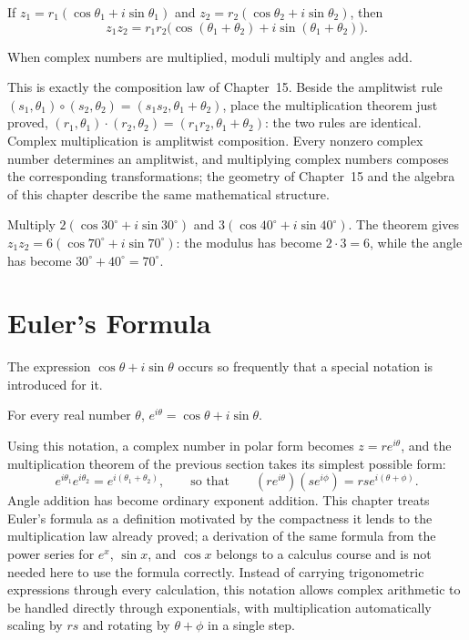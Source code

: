 \begin{theorem}
If $z_1 = r_1(\cos\theta_1+i\sin\theta_1)$ and $z_2 =
r_2(\cos\theta_2+i\sin\theta_2)$, then
\[
z_1z_2 = r_1r_2\Big(\cos(\theta_1+\theta_2) + i\sin(\theta_1+\theta_2)\Big).
\]
\end{theorem}

\begin{corollary}
When complex numbers are multiplied, moduli multiply and angles add.
\end{corollary}

This is exactly the composition law of Chapter~15. Beside the amplitwist
rule $(s_1,\theta_1)\circ(s_2,\theta_2) = (s_1s_2,\theta_1+\theta_2)$,
place the multiplication theorem just proved, $(r_1,\theta_1)\cdot(r_2,
\theta_2) = (r_1r_2,\theta_1+\theta_2)$: the two rules are identical.
Complex multiplication is amplitwist composition. Every nonzero complex
number determines an amplitwist, and multiplying complex numbers
composes the corresponding transformations; the geometry of Chapter~15
and the algebra of this chapter describe the same mathematical structure.

\begin{example}
Multiply $2(\cos30^\circ+i\sin30^\circ)$ and
$3(\cos40^\circ+i\sin40^\circ)$. The theorem gives $z_1z_2 =
6(\cos70^\circ+i\sin70^\circ)$: the modulus has become $2\cdot3=6$, while
the angle has become $30^\circ+40^\circ=70^\circ$.
\end{example}

\section{Euler's Formula}

The expression $\cos\theta+i\sin\theta$ occurs so frequently that a
special notation is introduced for it.

\begin{definition}
For every real number $\theta$, $e^{i\theta} = \cos\theta+i\sin\theta$.
\end{definition}

Using this notation, a complex number in polar form becomes $z =
re^{i\theta}$, and the multiplication theorem of the previous section
takes its simplest possible form:
\[
e^{i\theta_1}e^{i\theta_2} = e^{i(\theta_1+\theta_2)}, \qquad\text{so
that}\qquad (re^{i\theta})(se^{i\phi}) = rse^{i(\theta+\phi)}.
\]
Angle addition has become ordinary exponent addition. This chapter treats
Euler's formula as a definition motivated by the compactness it lends to
the multiplication law already proved; a derivation of the same formula
from the power series for $e^x$, $\sin x$, and $\cos x$ belongs to a
calculus course and is not needed here to use the formula correctly.
Instead of carrying trigonometric expressions through every calculation,
this notation allows complex arithmetic to be handled directly through
exponentials, with multiplication automatically scaling by $rs$ and
rotating by $\theta+\phi$ in a single step.

